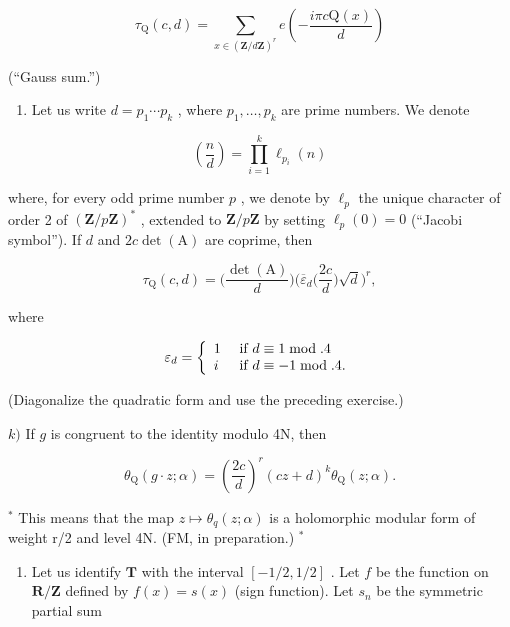 \[
\tau_ {\mathrm{Q}} (c, d) = \sum_ {x \in (\mathbf {Z} / d \mathbf {Z}) ^ {r}} e \left(- \frac {i \pi c \mathrm{Q} (x)}{d}\right)
\]

(“Gauss sum.”)

\begin{enumerate}
\def\labelenumi{\alph{enumi})}
\setcounter{enumi}{9}
\tightlist
\item
  Let us write \(d = p_{1} \cdots p_{k}\) , where \(p_{1}, \ldots, p_{k}\) are prime numbers. We denote
\end{enumerate}

\[
\left(\frac {n}{d}\right) = \prod_ {i = 1} ^ {k} \ell_ {p _ {i}} (n)
\]

where, for every odd prime number \(p\) , we denote by \(\ell_p\) the unique character of order 2 of \((\mathbf{Z}/p\mathbf{Z})^*\) , extended to \(\mathbf{Z}/p\mathbf{Z}\) by setting \(\ell_p(0) = 0\) (“Jacobi symbol”). If \(d\) and \(2c\det(\mathrm{A})\) are coprime, then

\[
\tau_ {\mathrm{Q}} (c, d) = \Big (\frac {\det (\mathrm{A})}{d} \Big) \Big (\overline {{\varepsilon}} _ {d} \Big (\frac {2 c}{d} \Big) \sqrt {d} \Big) ^ {r},
\]

where

\[
\varepsilon_ {d} = \left\{ \begin{array}{l l} 1 & \text { if } d \equiv 1 \bmod . 4 \\ i & \text { if } d \equiv - 1 \bmod . 4. \end{array} \right.
\]

(Diagonalize the quadratic form and use the preceding exercise.)

\(k)\) If \(g\) is congruent to the identity modulo 4N, then

\[
\theta_ {\mathrm{Q}} (g \cdot z; \alpha) = \left(\frac {2 c}{d}\right) ^ {r} (c z + d) ^ {k} \theta_ {\mathrm{Q}} (z; \alpha).
\]

\(^{*}\) This means that the map \(z \mapsto \theta_{q}(z; \alpha)\) is a holomorphic modular form of weight r/2 and level 4N. (FM, in preparation.) \(^{*}\)

\begin{enumerate}
\def\labelenumi{\arabic{enumi})}
\setcounter{enumi}{61}
\tightlist
\item
  Let us identify \(\mathbf{T}\) with the interval \([-1/2, 1/2]\) . Let \(f\) be the function on \(\mathbf{R}/\mathbf{Z}\) defined by \(f(x) = s(x)\) (sign function). Let \(s_n\) be the symmetric partial sum
\end{enumerate}

